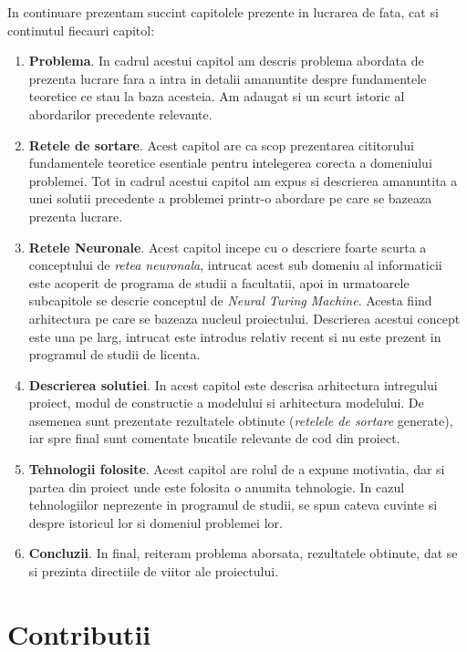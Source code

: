 \documentclass[12pt]{article}
\begin{document}
In continuare prezentam succint capitolele prezente in lucrarea de fata, cat si continutul fiecauri capitol:
\begin{enumerate}
	\item \textbf{Problema}. In cadrul acestui capitol am descris problema abordata de prezenta lucrare fara a intra in detalii amanuntite despre fundamentele teoretice ce stau la baza acesteia. Am adaugat si un scurt istoric al abordarilor precedente relevante. 
	\item \textbf{Retele de sortare}. Acest capitol are ca scop prezentarea cititorului fundamentele teoretice esentiale pentru intelegerea corecta a domeniului problemei. Tot in cadrul acestui capitol am expus si descrierea amanuntita a unei solutii precedente a problemei printr-o abordare pe care se bazeaza prezenta lucrare.
	\item \textbf{Retele Neuronale}. Acest capitol incepe cu o descriere foarte scurta a conceptului de \textit{retea neuronala}, intrucat acest sub domeniu al informaticii este acoperit de programa de studii a facultatii, apoi in urmatoarele subcapitole se descrie conceptul de \textit{Neural Turing Machine}. Acesta fiind arhitectura pe care se bazeaza nucleul proiectului. Descrierea acestui concept este una pe larg, intrucat este introdus relativ recent si nu este prezent in programul de studii de licenta.
	\item \textbf{Descrierea solutiei}. In acest capitol este descrisa arhitectura intregului proiect, modul de constructie a modelului si arhitectura modelului. De asemenea sunt prezentate rezultatele obtinute (\textit{retelele de sortare} generate), iar spre final sunt comentate bucatile relevante de cod din proiect.
	\item \textbf{Tehnologii folosite}. Acest capitol are rolul de a expune motivatia, dar si partea din proiect unde este folosita o anumita tehnologie. In cazul tehnologiilor neprezente in programul de studii, se spun cateva cuvinte si despre istoricul lor si domeniul problemei lor.
	\item \textbf{Concluzii}. In final, reiteram problema aborsata, rezultatele obtinute, dat se si prezinta directiile de viitor ale proiectului.
\end{enumerate}
 
\section{Contributii}
\end{document}
